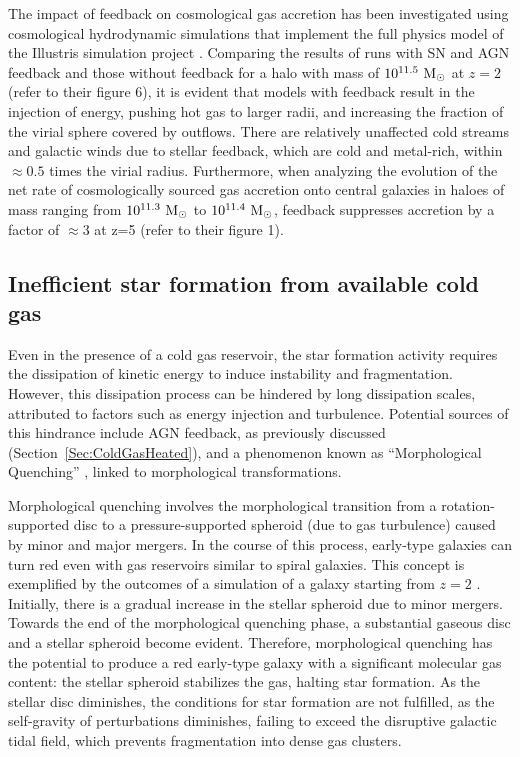 \documentclass[baaa]{baaa}
\begin{document}
The impact of feedback on cosmological gas accretion has been investigated using cosmological
hydrodynamic simulations that implement the full physics
model of the Illustris simulation project \citep{Nelson_2015}. 
Comparing the results of runs with SN and AGN feedback and those without feedback for a halo with mass of $10^{11.5}~{\rm M}_{\odot}$ at $z=2$ (refer to their figure 6), it is evident that models with feedback result in the injection of energy, pushing hot gas to larger radii, and increasing the fraction of the virial sphere covered by outflows. There are relatively unaffected cold streams and galactic winds due to stellar feedback, which are cold and metal-rich, within $\approx 0.5$ times the virial radius.
Furthermore, when analyzing the evolution of the net rate of cosmologically sourced gas accretion onto central galaxies in haloes of mass ranging from $10^{11.3}~{\rm M}_{\odot}$ to $10^{11.4}~{\rm M}_{\odot}$, feedback suppresses accretion by a factor of $\approx 3$ at z=5 (refer to their figure 1).


\subsection{Inefficient star formation from available cold gas}


Even in the presence of a cold gas reservoir, the star formation activity requires the dissipation of kinetic energy to induce instability and fragmentation. However, this dissipation process can be hindered by long dissipation scales, attributed to factors such as energy injection and turbulence. Potential sources of this hindrance include AGN feedback, as previously discussed (Section~\ref{Sec:ColdGasHeated}), and a phenomenon known as ``Morphological Quenching'' \citep{Martig_2009}, linked to morphological transformations.


Morphological quenching involves the morphological transition from a rotation-supported disc to a pressure-supported spheroid (due to gas turbulence) caused by minor and major mergers. In the course of this process, early-type galaxies can turn red even with gas reservoirs similar to spiral galaxies.
This concept is exemplified by the outcomes of a simulation of a galaxy starting from $z=2$ \citep[see their figure 2]{Martig_2009}. Initially, there is a gradual increase in the stellar spheroid due to minor mergers. Towards the end of the morphological quenching phase, a substantial gaseous disc and a stellar spheroid become evident. Therefore, morphological quenching has the potential to produce a red early-type galaxy with a significant molecular gas content: the stellar spheroid stabilizes the gas, halting star formation. As the stellar disc diminishes, the conditions for star formation are not fulfilled, as the self-gravity of perturbations diminishes, failing to exceed the disruptive galactic tidal field, which prevents fragmentation into dense gas clusters.
\end{document}
